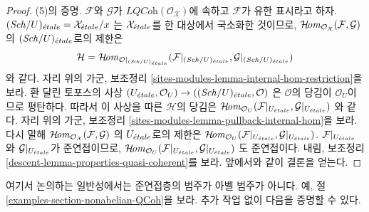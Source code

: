 \begin{proof}
\medskip\noindent
(5)의 증명. $\mathcal{F}$와 $\mathcal{G}$가
$\textit{LQCoh}(\mathcal{O}_\mathcal{X})$에 속하고
$\mathcal{F}$가 유한 표시라고 하자.
$(\mathit{Sch}/U)_{\acute{e}tale} = \mathcal{X}_{\acute{e}tale}/x$
는 $\mathcal{X}_{\acute{e}tale}$를 한 대상에서 국소화한 것이므로,
$\mathop{\mathcal{H}\!\mathit{om}}\nolimits_{\mathcal{O}_\mathcal{X}}(\mathcal{F}, \mathcal{G})$
의 $(\mathit{Sch}/U)_{\acute{e}tale}$로의 제한은
$$
\mathcal{H} =
\mathop{\mathcal{H}\!\mathit{om}}\nolimits_{\mathcal{O}|_{(\mathit{Sch}/U)_{\acute{e}tale}}}(
\mathcal{F}|_{(\mathit{Sch}/U)_{\acute{e}tale}}, \mathcal{G}|_{(\mathit{Sch}/U)_{\acute{e}tale}})
$$
와 같다. 자리 위의 가군, 보조정리
\ref{sites-modules-lemma-internal-hom-restriction}을 보라.
환 달린 토포스의 사상
$(U_{\acute{e}tale}, \mathcal{O}_U) \to ((\mathit{Sch}/U)_{\acute{e}tale}, \mathcal{O})$
은 $\mathcal{O}$의 당김이 $\mathcal{O}_U$이므로 평탄하다.
따라서 이 사상을 따른 $\mathcal{H}$의 당김은
$\mathop{\mathcal{H}\!\mathit{om}}\nolimits_{\mathcal{O}_U}(\mathcal{F}|_{U_{\acute{e}tale}}, \mathcal{G}|_{U_{\acute{e}tale}})$
와 같다. 자리 위의 가군, 보조정리
\ref{sites-modules-lemma-pullback-internal-hom}을 보라.
다시 말해
$\mathop{\mathcal{H}\!\mathit{om}}\nolimits_{\mathcal{O}_\mathcal{X}}(\mathcal{F}, \mathcal{G})$
의 $U_{\acute{e}tale}$로의 제한은
$\mathop{\mathcal{H}\!\mathit{om}}\nolimits_{\mathcal{O}_U}(\mathcal{F}|_{U_{\acute{e}tale}}, \mathcal{G}|_{U_{\acute{e}tale}})$.
$\mathcal{F}|_{U_{\acute{e}tale}}$와 $\mathcal{G}|_{U_{\acute{e}tale}}$가 준연접이므로,
$\mathop{\mathcal{H}\!\mathit{om}}\nolimits_{\mathcal{O}_U}(\mathcal{F}|_{U_{\acute{e}tale}}, \mathcal{G}|_{U_{\acute{e}tale}})$
도 준연접이다. 내림, 보조정리
\ref{descent-lemma-properties-quasi-coherent}를 보라.
앞에서와 같이 결론을 얻는다.
\end{proof}

\noindent
여기서 논의하는 일반성에서는 준연접층의 범주가 아벨 범주가 아니다.
예, 절 \ref{examples-section-nonabelian-QCoh}을 보라.
추가 작업 없이 다음을 증명할 수 있다.

